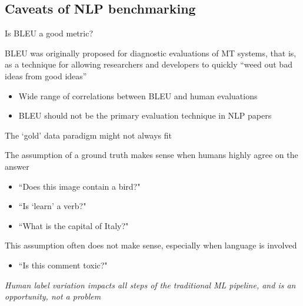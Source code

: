 \documentclass[12pt,aspectratio=169,handout]{beamer}
\begin{document}
\subsection{Caveats of NLP benchmarking}


\begin{frame}{Is BLEU a good metric?}

BLEU was originally proposed for diagnostic evaluations of MT systems, that is, as a technique for allowing researchers and developers to quickly ``weed out bad ideas from good ideas''

\begin{itemize}
\item Wide range of correlations between BLEU and human evaluations
\item BLEU should not be the primary evaluation technique in NLP papers
\end{itemize}



\end{frame}


\begin{frame}{The `gold' data paradigm might not always fit}

The assumption of a ground truth makes sense when humans highly agree on the answer

\begin{itemize}
	\item ``Does this image contain a bird?"
	\item ``Is `learn' a verb?"
	\item ``What is the capital of Italy?"
\end{itemize}

This assumption often does not make sense, especially when language is involved

\begin{itemize}
	\item ``Is this comment toxic?"
\end{itemize}

\emph{Human label variation impacts all steps of the traditional ML pipeline, and is an opportunity, not a problem}


\end{frame}
\end{document}
